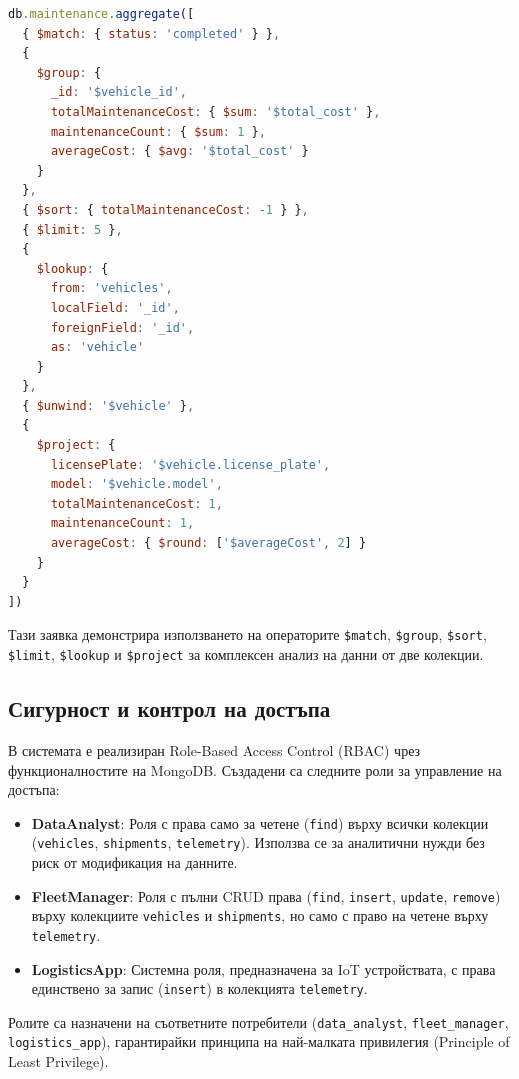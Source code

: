 \begin{lstlisting}[language=JavaScript]
db.maintenance.aggregate([
  { $match: { status: 'completed' } },
  {
    $group: {
      _id: '$vehicle_id',
      totalMaintenanceCost: { $sum: '$total_cost' },
      maintenanceCount: { $sum: 1 },
      averageCost: { $avg: '$total_cost' }
    }
  },
  { $sort: { totalMaintenanceCost: -1 } },
  { $limit: 5 },
  {
    $lookup: {
      from: 'vehicles',
      localField: '_id',
      foreignField: '_id',
      as: 'vehicle'
    }
  },
  { $unwind: '$vehicle' },
  {
    $project: {
      licensePlate: '$vehicle.license_plate',
      model: '$vehicle.model',
      totalMaintenanceCost: 1,
      maintenanceCount: 1,
      averageCost: { $round: ['$averageCost', 2] }
    }
  }
])
\end{lstlisting}

Тази заявка демонстрира използването на операторите \texttt{\$match}, \texttt{\$group}, \texttt{\$sort}, \texttt{\$limit}, \texttt{\$lookup} и \texttt{\$project} за комплексен анализ на данни от две колекции.

\subsection{Сигурност и контрол на достъпа}

В системата е реализиран Role-Based Access Control (RBAC) чрез функционалностите на MongoDB. Създадени са следните роли за управление на достъпа:
\begin{itemize}
    \item \textbf{DataAnalyst}: Роля с права само за четене (\texttt{find}) върху всички колекции (\texttt{vehicles}, \texttt{shipments}, \texttt{telemetry}). Използва се за аналитични нужди без риск от модификация на данните.
    \item \textbf{FleetManager}: Роля с пълни CRUD права (\texttt{find}, \texttt{insert}, \texttt{update}, \texttt{remove}) върху колекциите \texttt{vehicles} и \texttt{shipments}, но само с право на четене върху \texttt{telemetry}.
    \item \textbf{LogisticsApp}: Системна роля, предназначена за IoT устройствата, с права единствено за запис (\texttt{insert}) в колекцията \texttt{telemetry}.
\end{itemize}

Ролите са назначени на съответните потребители (\texttt{data\_analyst}, \texttt{fleet\_manager}, \texttt{logistics\_app}), гарантирайки принципа на най-малката привилегия (Principle of Least Privilege).

